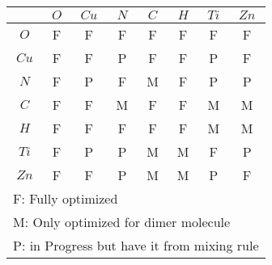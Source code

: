 \documentclass[12pt]{article}
\begin{document}
\begin{table}[h]
\begin{tabular}{|c|c|c|c|c|c|c|c|}
\hline
   & $O$ & $Cu$ & $N$ & $C$ & $H$ & $Ti$ & $Zn$ \\ \hline
$O$	& F & F & F & F & F & F & F \\ \hline
$Cu$	& F & F & P & F & F & P & F \\ \hline
$N$ 	& F & P & F & M & F & P & P \\ \hline
$C$   	& F & F & M & F & F & M & M \\ \hline
$H$   	& F & F & F & F & F & M & M \\ \hline
$Ti$   	& F & P & P & M & M & F & P \\ \hline
$Zn$  	& F & F & P & M & M & P & F \\ \hline
\multicolumn{8}{l}{F: Fully optimized} \\
\multicolumn{8}{l}{M: Only optimized for dimer molecule} \\
\multicolumn{8}{l}{P: in Progress but have it from mixing rule} \\
\end{tabular}
\end{table}
\end{document}
